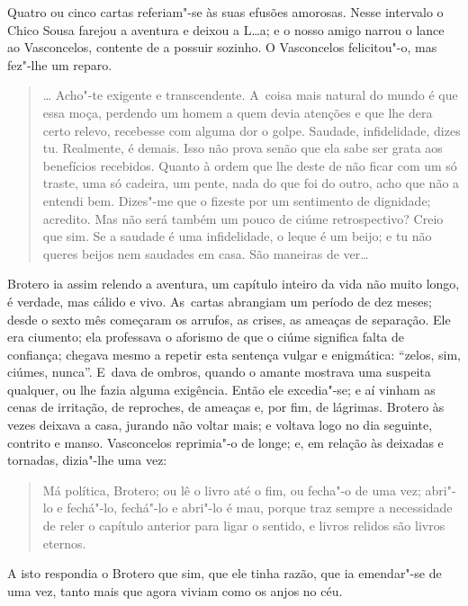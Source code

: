 Quatro ou cinco cartas referiam"-se às suas efusões amorosas. Nesse
intervalo o Chico Sousa farejou a aventura e deixou a L\ldots{}a; e o nosso
amigo narrou o lance ao Vasconcelos, contente de a possuir sozinho. O
Vasconcelos felicitou"-o, mas fez"-lhe um reparo.

\begin{quote}
\ldots{} Acho"-te exigente e transcendente. A~coisa mais natural do mundo é
que essa moça, perdendo um homem a quem devia atenções e que lhe dera
certo relevo, recebesse com alguma dor o golpe. Saudade, infidelidade,
dizes tu. Realmente, é demais. Isso não prova senão que ela sabe ser
grata aos benefícios recebidos. Quanto à ordem que lhe deste de não
ficar com um só traste, uma só cadeira, um pente, nada do que foi do
outro, acho que não a entendi bem. Dizes"-me que o fizeste por um
sentimento de dignidade; acredito. Mas não será também um pouco de ciúme
retrospectivo? Creio que sim. Se a saudade é uma infidelidade, o leque é
um beijo; e tu não queres beijos nem saudades em casa. São maneiras de
ver\ldots{}
\end{quote}

Brotero ia assim relendo a aventura, um capítulo inteiro da vida não
muito longo, é verdade, mas cálido e vivo. As~cartas abrangiam um
período de dez meses; desde o sexto mês começaram os arrufos, as crises,
as ameaças de separação. Ele era ciumento; ela professava o aforismo de
que o ciúme significa falta de confiança; chegava mesmo a repetir esta
sentença vulgar e enigmática: ``zelos, sim, ciúmes, nunca''. E~dava de
ombros, quando o amante mostrava uma suspeita qualquer, ou lhe fazia
alguma exigência. Então ele excedia"-se; e aí vinham as cenas de
irritação, de reproches, de ameaças e, por fim, de lágrimas. Brotero às
vezes deixava a casa, jurando não voltar mais; e voltava logo no dia
seguinte, contrito e manso. Vasconcelos reprimia"-o de longe; e, em
relação às deixadas e tornadas, dizia"-lhe uma vez:

\begin{quote}
Má política, Brotero; ou lê o livro até o fim, ou fecha"-o de uma vez;
abri"-lo e fechá"-lo, fechá"-lo e abri"-lo é mau, porque traz sempre a
necessidade de reler o capítulo anterior para ligar o sentido, e livros
relidos são livros eternos.
\end{quote}

A isto respondia o Brotero que sim, que ele tinha razão, que ia
emendar"-se de uma vez, tanto mais que agora viviam como os anjos no céu.


